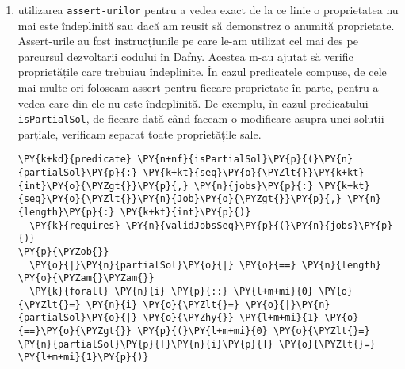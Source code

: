 \begin{enumerate}
\begin{Verbatim}[commandchars=\\\{\}, fontsize=\footnotesize]
      \PY{k}{assert} \PY{n}{isOptParSol}\PY{p}{(}\PY{n}{solution}\PY{p}{,} \PY{n}{jobs}\PY{p}{,} \PY{n}{i} \PY{o}{+} \PY{l+m+mi}{1}\PY{p}{)}\PY{p}{;}
    \PY{p}{\PYZcb{}}
    \PY{k}{else}
    \PY{p}{\PYZob{}}
      \PY{k}{assume} \PY{k+kc}{false}\PY{p}{;}
      \PY{n}{solution}\PY{p}{,} \PY{n}{dp} \PY{o}{:=} 
       \PY{n}{leadsToOptWithJobI}\PY{p}{(}\PY{n}{jobs}\PY{p}{,} \PY{n}{dp}\PY{p}{,} \PY{n}{allSol}\PY{p}{,} \PY{n}{i}\PY{p}{,} \PY{n}{maxProfit}\PY{p}{,} \PY{n}{optParSolWithI}\PY{p}{)}\PY{p}{;}
      \PY{k}{assert} \PY{n}{isOptParSol}\PY{p}{(}\PY{n}{solution}\PY{p}{,} \PY{n}{jobs}\PY{p}{,} \PY{n}{i} \PY{o}{+} \PY{l+m+mi}{1}\PY{p}{)}\PY{p}{;}
    \PY{p}{\PYZcb{}}
    \PY{n}{allSol} \PY{o}{:=} \PY{n}{allSol} \PY{o}{+} \PY{p}{[}\PY{n}{solution}\PY{p}{]}\PY{p}{;} 
    \PY{n}{i} \PY{o}{:=} \PY{n}{i} \PY{o}{+} \PY{l+m+mi}{1}\PY{p}{;}
  \PY{p}{\PYZcb{}}
  \PY{n}{sol} \PY{o}{:=} \PY{n}{solution}\PY{p}{;}
  \PY{n}{profit} \PY{o}{:=} \PY{n}{dp}\PY{p}{[}\PY{o}{|}\PY{n}{dp}\PY{o}{|}\PY{o}{\PYZhy{}}\PY{l+m+mi}{1}\PY{p}{]}\PY{p}{;}
\PY{p}{\PYZcb{}}
\end{Verbatim}
    \item utilizarea \texttt{assert-urilor} pentru a vedea exact de la ce linie o proprietatea nu mai este îndeplinită sau dacă am reusit să demonstrez o anumită proprietate. Assert-urile au fost instrucțiunile pe care le-am utilizat cel mai des pe parcursul dezvoltarii codului în Dafny. Acestea m-au ajutat să verific proprietățile care trebuiau îndeplinite. În cazul predicatele compuse, de cele mai multe ori foloseam assert pentru fiecare proprietate în parte, pentru a vedea care din ele nu este îndeplinită. 
    De exemplu, în cazul predicatului \texttt{isPartialSol}, de fiecare dată când faceam o modificare asupra unei soluții parțiale, verificam separat toate proprietățile sale. 
    \begin{Verbatim}[commandchars=\\\{\}, fontsize=\footnotesize]
\PY{k+kd}{predicate} \PY{n+nf}{isPartialSol}\PY{p}{(}\PY{n}{partialSol}\PY{p}{:} \PY{k+kt}{seq}\PY{o}{\PYZlt{}}\PY{k+kt}{int}\PY{o}{\PYZgt{}}\PY{p}{,} \PY{n}{jobs}\PY{p}{:} \PY{k+kt}{seq}\PY{o}{\PYZlt{}}\PY{n}{Job}\PY{o}{\PYZgt{}}\PY{p}{,} \PY{n}{length}\PY{p}{:} \PY{k+kt}{int}\PY{p}{)}
  \PY{k}{requires} \PY{n}{validJobsSeq}\PY{p}{(}\PY{n}{jobs}\PY{p}{)}
\PY{p}{\PYZob{}}
  \PY{o}{|}\PY{n}{partialSol}\PY{o}{|} \PY{o}{==} \PY{n}{length} \PY{o}{\PYZam{}\PYZam{}}
  \PY{k}{forall} \PY{n}{i} \PY{p}{::} \PY{l+m+mi}{0} \PY{o}{\PYZlt{}=} \PY{n}{i} \PY{o}{\PYZlt{}=} \PY{o}{|}\PY{n}{partialSol}\PY{o}{|} \PY{o}{\PYZhy{}} \PY{l+m+mi}{1} \PY{o}{==}\PY{o}{\PYZgt{}} \PY{p}{(}\PY{l+m+mi}{0} \PY{o}{\PYZlt{}=} \PY{n}{partialSol}\PY{p}{[}\PY{n}{i}\PY{p}{]} \PY{o}{\PYZlt{}=} \PY{l+m+mi}{1}\PY{p}{)}

\end{Verbatim}
\end{enumerate}
